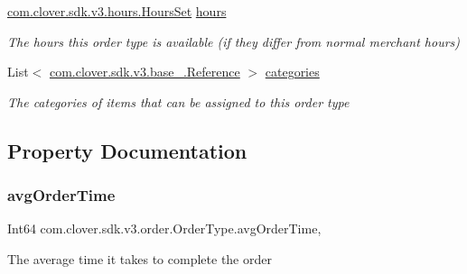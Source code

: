 \begin{DoxyCompactItemize}
\hyperlink{classcom_1_1clover_1_1sdk_1_1v3_1_1hours_1_1_hours_set}{com.\+clover.\+sdk.\+v3.\+hours.\+Hours\+Set} \hyperlink{classcom_1_1clover_1_1sdk_1_1v3_1_1order_1_1_order_type_a0ac9ba81322329c556351e8b819e9475}{hours}
\begin{DoxyCompactList}\small\item\em The hours this order type is available (if they differ from normal merchant hours) \end{DoxyCompactList}\item 
List$<$ \hyperlink{classcom_1_1clover_1_1sdk_1_1v3_1_1base___1_1_reference}{com.\+clover.\+sdk.\+v3.\+base\+\_\+.\+Reference} $>$ \hyperlink{classcom_1_1clover_1_1sdk_1_1v3_1_1order_1_1_order_type_a53f9c84cac095eb9b387d90ce38e7a79}{categories}
\begin{DoxyCompactList}\small\item\em The categories of items that can be assigned to this order type \end{DoxyCompactList}\end{DoxyCompactItemize}


\subsection{Property Documentation}
\mbox{\label{classcom_1_1clover_1_1sdk_1_1v3_1_1order_1_1_order_type_a8e608366a9f8370cc4f9439a1f2561cd}} 
\subsubsection{\texorpdfstring{avg\+Order\+Time}{avgOrderTime}}
{\footnotesize\ttfamily Int64 com.\+clover.\+sdk.\+v3.\+order.\+Order\+Type.\+avg\+Order\+Time\hspace{0.3cm}{\ttfamily [get]}, {\ttfamily [set]}}



The average time it takes to complete the order 

\mbox{\label{classcom_1_1clover_1_1sdk_1_1v3_1_1order_1_1_order_type_a53f9c84cac095eb9b387d90ce38e7a79}} 
